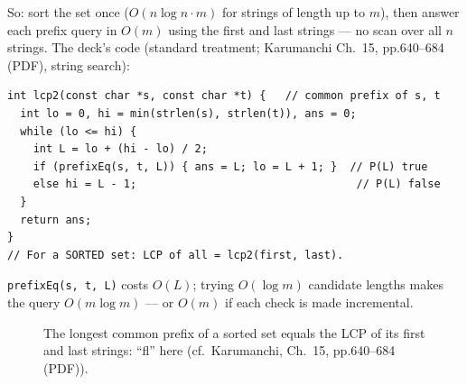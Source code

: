 \documentclass[11pt]{article}
\begin{document}
So: sort the set once ($O(n \log n \cdot m)$ for strings of length up to $m$), then answer each prefix query in $O(m)$ using the first and last strings --- no scan over all $n$ strings. The deck's code (standard treatment; Karumanchi Ch.~15, pp.640--684 (PDF), string search):

{\footnotesize
\begin{verbatim}
int lcp2(const char *s, const char *t) {   // common prefix of s, t
  int lo = 0, hi = min(strlen(s), strlen(t)), ans = 0;
  while (lo <= hi) {
    int L = lo + (hi - lo) / 2;
    if (prefixEq(s, t, L)) { ans = L; lo = L + 1; }  // P(L) true
    else hi = L - 1;                                  // P(L) false
  }
  return ans;
}
// For a SORTED set: LCP of all = lcp2(first, last).
\end{verbatim}
}

\texttt{prefixEq(s, t, L)} costs $O(L)$; trying $O(\log m)$ candidate lengths makes the query $O(m \log m)$ --- or $O(m)$ if each check is made incremental.

\begin{figure}[h]
  \centering
  \caption{The longest common prefix of a sorted set equals the LCP of its first and last strings: ``fl'' here (cf.\ Karumanchi, Ch.~15, pp.640--684 (PDF)).}
  \label{fig:lcp}
\end{figure}
\end{document}
